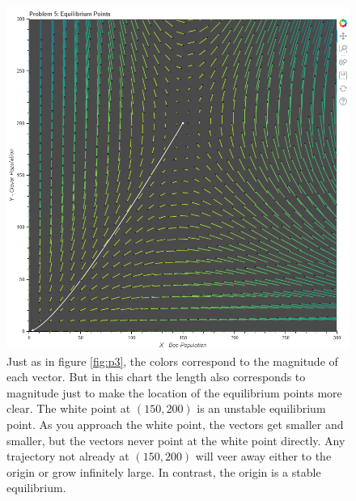 \documentclass[12pt,a4paper,titlepage]{report}
\begin{document}
		\begin{figure}[htbp]
			\centerline{\includegraphics[scale=.5]{charts/problem5_chart.png}}
			\caption{Just as in figure \ref{fig:p3}, the colors correspond to the magnitude of each vector. But in this chart the length also corresponds to magnitude just to make the location of the equilibrium points more clear. The white point at \((150,200)\) is an unstable equilibrium point. As you approach the white point, the vectors get smaller and smaller, but the vectors never point at the white point directly. Any trajectory not already at \((150,200)\) will veer away either to the origin or grow infinitely large. In contrast, the origin is a stable equilibrium.}
			\label{fig:p5}
		\end{figure}\\
\end{document}
